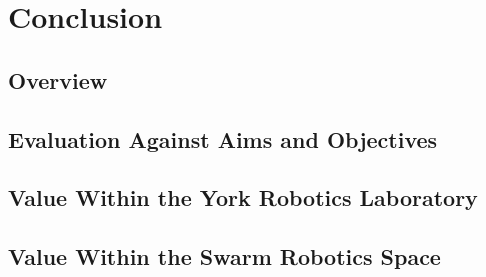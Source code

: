 
\chapter[Conclusion]{Conclusion} %

\label{Chapter12} %


\section{Overview}



\section{Evaluation Against Aims and Objectives}



\section{Value Within the York Robotics Laboratory}



\section{Value Within the Swarm Robotics Space}


